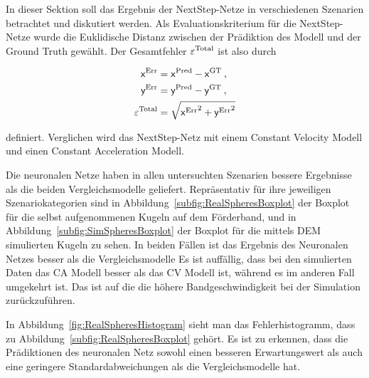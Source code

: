 



In dieser Sektion soll das Ergebnis der NextStep-Netze in verschiedenen Szenarien betrachtet und diskutiert werden.
Als Evaluationskriterium für die NextStep-Netze wurde die Euklidische Distanz zwischen der Prädiktion des Modell und der Ground Truth gewählt.
Der Gesamtfehler \(\varepsilon{^{\text{Total}}} \) ist also durch 

\begin{align*}
    \mathsf{x}{^{\text{Err}}} &=  \mathsf{x}{^{\text{Pred}}} -  \mathsf{x}{^{\text{GT}}} \: ,\\
    \mathsf{y}{^{\text{Err}}} &=  \mathsf{y}{^{\text{Pred}}} -  \mathsf{y}{^{\text{GT}}} \: ,\\
    \varepsilon{^{\text{Total}}} &= \sqrt{ \mathsf{x}{^{\text{Err}}}^2 +  \mathsf{y}{^{\text{Err}}}^2}
\end{align*}

definiert. Verglichen wird das NextStep-Netz mit einem Constant Velocity Modell und einen Constant Acceleration Modell.

Die neuronalen Netze haben in allen untersuchten Szenarien bessere Ergebnisse als die beiden Vergleichsmodelle geliefert.
Repräsentativ für ihre jeweiligen Szenariokategorien sind in Abbildung~\ref{subfig:RealSpheresBoxplot} der Boxplot für die selbst aufgenommenen Kugeln auf dem Förderband,
und in Abbildung~\ref{subfig:SimSpheresBoxplot} der Boxplot für die mittels DEM simulierten Kugeln zu sehen.
In beiden Fällen ist das Ergebnis des Neuronalen Netzes besser als die Vergleichsmodelle
Es ist auffällig, dass bei den simulierten Daten das CA Modell besser als das CV Modell ist, während es im anderen Fall umgekehrt ist.
Das ist auf die die höhere Bandgeschwindigkeit bei der Simulation zurückzuführen. 


In Abbildung~\ref{fig:RealSpheresHistogram} sieht man das Fehlerhistogramm, dass zu Abbildung~\ref{subfig:RealSpheresBoxplot} gehört.
Es ist zu erkennen, dass die Prädiktionen des neuronalen Netz sowohl einen besseren Erwartungswert als auch eine geringere Standardabweichungen als die Vergleichsmodelle hat.


